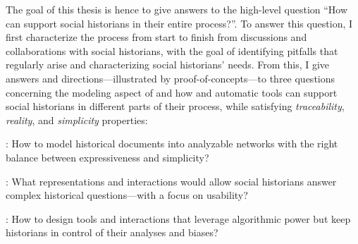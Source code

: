 The goal of this thesis is hence to give answers to the high-level question ``How can \va support social historians in their entire \hsna process?''.
To answer this question, I first characterize the \hsna process from start to finish from discussions and collaborations with social historians, with the goal of identifying pitfalls that regularly arise and characterizing social historians' needs.
From this, I give answers and directions---illustrated by proof-of-concepts---to three questions concerning the modeling aspect of \hsna and how \va and automatic tools can support social historians in different parts of their process, while satisfying \emph{traceability}, \emph{reality}, and \emph{simplicity} properties:

\begin{description}
    \item \qone:  How to model historical documents into analyzable networks with the right balance between expressiveness and simplicity?
    \item \qtwo:  What representations and interactions would allow social historians answer complex historical questions---with a focus on usability?
    \item \qthree: How to design \va tools and interactions that leverage algorithmic power but keep historians in control of their analyses and biases?
\end{description}

